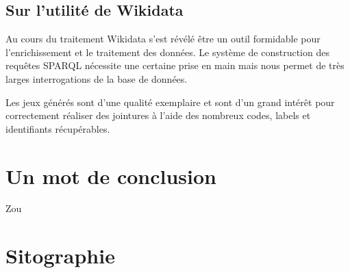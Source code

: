 \documentclass[hidelinks, 12pt]{report}
\begin{document}
\section{Sur l'utilité de Wikidata}

Au cours du traitement Wikidata s'est révélé être un outil formidable pour l'enrichissement et le traitement des données. Le système de construction des requêtes SPARQL nécessite une certaine prise en main mais nous permet de très larges interrogations de la base de données.

Les jeux générés sont d'une qualité exemplaire et sont d'un grand intérêt pour correctement réaliser des jointures à l'aide des nombreux codes, labels et identifiants récupérables.
\newpage





%





\chapter{Un mot de conclusion}

Zou





%





\chapter{Sitographie}
\printbibliography[heading=none]
\newpage

\end{document}
